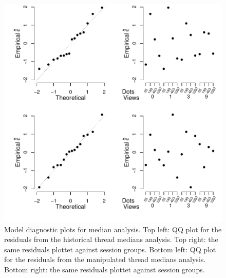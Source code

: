 \documentclass[9pt,a4paper,twocolumn,lineno]{article}
\begin{document}
\begin{figure}%
	\centering
	\hspace{-20px}\includegraphics[width=.75\textwidth]{qqplots_median.pdf}
	\caption{Model diagnostic plots for median analysis. Top left: QQ plot for the residuals from the historical thread medians analysis. Top right: the same residuals plottet against session groups. Bottom left: QQ plot for the residuals from the manipulated thread medians analysis. Bottom right: the same residuals plottet against session groups.}
	\label{fig: qq plots median}
\end{figure}
\newpage
\end{document}
